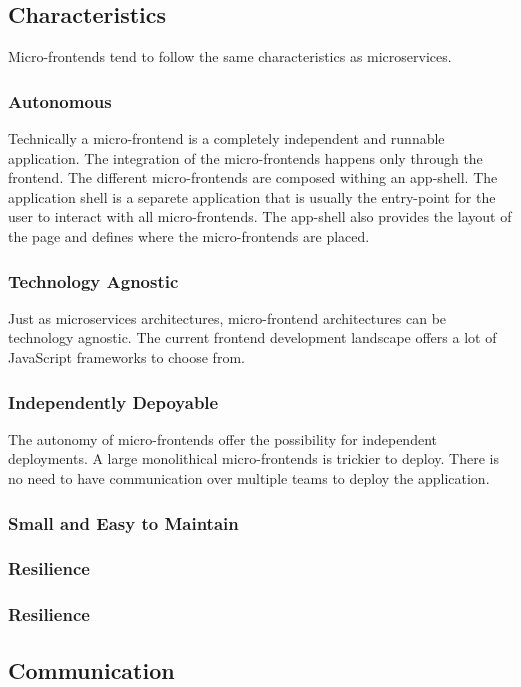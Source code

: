 \subsection{Characteristics}

Micro-frontends tend to follow the same characteristics as microservices.

\subsubsection{Autonomous}

Technically a micro-frontend is a completely independent and runnable application.
The integration of the micro-frontends happens only through the frontend. The different micro-frontends are composed withing an app-shell. The application shell is a separete application that is usually the entry-point for the user to interact with all micro-frontends. The app-shell also provides the layout of the page and defines where the micro-frontends are placed.

\subsubsection{Technology Agnostic}

Just as microservices architectures, micro-frontend architectures can be technology agnostic. The current frontend development landscape offers a lot of JavaScript frameworks to choose from.

\subsubsection{Independently Depoyable}

The autonomy of micro-frontends offer the possibility for independent deployments. A large monolithical micro-frontends is trickier to deploy. There is no need to have communication over multiple teams to deploy the application.


\subsubsection{Small and Easy to Maintain}



\subsubsection{Resilience}



\subsubsection{Resilience}




\subsection{Communication}


